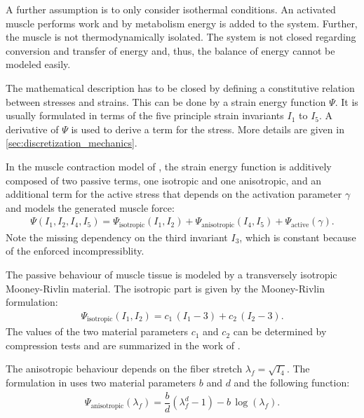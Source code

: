 A further assumption is to only consider isothermal conditions. 
An activated muscle performs work and by metabolism energy is added to the system. Further, the muscle is not thermodynamically isolated. The system is not closed regarding conversion and transfer of energy and, thus, the balance of energy cannot be modeled easily.

The mathematical description has to be closed by defining a constitutive relation between stresses and strains. This can be done by a strain energy function $\Psi$. It is usually formulated in terms of the five principle strain invariants $I_1$ to $I_5$. A derivative of $\Psi$ is used to derive a term for the stress. More details are given in \cref{sec:discretization_mechanics}.

In the muscle contraction model of \cite{Heidlauf2013}, the strain energy function is additively composed of two passive terms, one isotropic and one anisotropic, and an additional term for the active stress that depends on the activation parameter $\gamma$ and models the generated muscle force:%
\begin{align*}
  \Psi(I_1,I_2,I_4,I_5) = \Psi_\text{isotropic}(I_1,I_2) + \Psi_\text{anisotropic}(I_4,I_5) + \Psi_\text{active}(\gamma).
\end{align*}
Note the missing dependency on the third invariant $I_3$, which is constant because of the enforced incompressiblity.

The passive behaviour of muscle tissue is modeled by a transversely isotropic Mooney-Rivlin material.
The isotropic part is given by the Mooney-Rivlin formulation:%
\begin{align}\label{eq:mooney_rivlin}
  \Psi_\text{isotropic}(I_1,I_2) = c_1\,(I_1 - 3) + c_2\,(I_2-3).
\end{align}
The values of the two material parameters $c_1$ and $c_2$ can be determined by compression tests and are summarized in the work of \cite{Heidlauf2013}.

The anisotropic behaviour depends on the fiber stretch $\lambda_f = \sqrt{I_4}$. The formulation in \cite{Heidlauf2013} uses two material parameters $b$ and $d$ and the following function:
\begin{align*}
  \Psi_\text{anisotropic}(\lambda_f) = \dfrac{b}{d}(\lambda_f^d - 1) - b\,\log(\lambda_f).
\end{align*}
%

